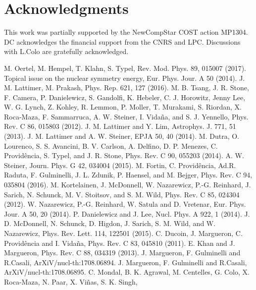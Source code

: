\documentclass
[aps,prc,twocolumn,showpacs,showkeys,amsmath,floatfix,superscriptaddress]{revtex4}
\begin{document}
{{ 

\section*{Acknowledgments}
This work was partially supported by the NewCompStar COST action MP1304.
DC acknowledges the financial support from the CNRS and LPC.
Discussions with L.Colo are gratefully acknowledged. 

\begin{thebibliography}{}
 M. Oertel, M. Hempel, T. Klahn, S. Typel, Rev. Mod. Phys. 89, 015007 (2017).
 Topical issue on the nuclear symmetry energy, Eur. Phys. Jour. A 50 (2014).
 J. M. Lattimer, M. Prakash, Phys. Rep. 621, 127 (2016).
 M. B. Tsang, J. R. Stone, F. Camera, P. Danielewicz, S. Gandolfi, K. Hebeler, C. J. Horowitz, Jenny Lee, 
W. G. Lynch, Z. Kohley, R. Lemmon, P. Moller, T. Murakami, S. Riordan, X. Roca-Maza, F. Sammarruca, 
A. W. Steiner, I. Vida\~na, and S. J. Yennello, Phys. Rev. C 86, 015803 (2012).
 J. M. Lattimer and Y. Lim, Astrophys. J. 771, 51 (2013).
 J. M. Lattimer and A. W. Steiner, EPJA 50, 40 (2014).
 M. Dutra, O. Lourenco, S. S. Avancini, B. V. Carlson, A. Delfino, D. P. Menezes, 
C. Provid\^encia, S. Typel, and J. R. Stone, Phys. Rev. C 90, 055203 (2014).
 A. W. Steiner, Journ. Phys. G 42, 034004 (2015).
 M. Fortin, C. Provid\^encia, Ad.R. Raduta, F. Gulminelli, J. L. Zdunik, P. Haensel, and M. Bejger, 
Phys. Rev. C 94, 035804 (2016).
 M. Kortelainen, J. McDonnell, W. Nazarewicz, P.-G. Reinhard, J. Sarich, N. Schunck,
M. V. Stoitsov, and S. M. Wild, Phys. Rev. C 85, 024304 (2012).
 W. Nazarewicz, P.-G. Reinhard, W. Satula and D. Vretenar, Eur. Phys. Jour. A 50,  20 (2014).
 P. Danielewicz and J. Lee, Nucl. Phys. A 922, 1 (2014).
 J. D. McDonnell, N. Schunck, D. Higdon, J. Sarich, S. M. Wild, and W. Nazarewicz, 
Phys. Rev. Lett. 114, 122501 (2015).
 C. Ducoin, J. Margueron, C. Provid\^encia and I. Vida\~na, Phys. Rev. C 83, 045810 (2011).
 E. Khan and J. Margueron, Phys. Rev. C 88, 034319 (2013).
 J. Margueron, F. Gulminelli and R.Casali, ArXiV/nucl-th:1708.06894. 
 J. Margueron, F. Gulminelli and R.Casali, ArXiV/nucl-th:1708.06895.
 C. Mondal, B. K. Agrawal, M. Centelles, G. Colo, X. Roca-Maza, N. Paar, X. Vi\~nas, S. K. Singh, 

\end{thebibliography}}}
\end{document}
